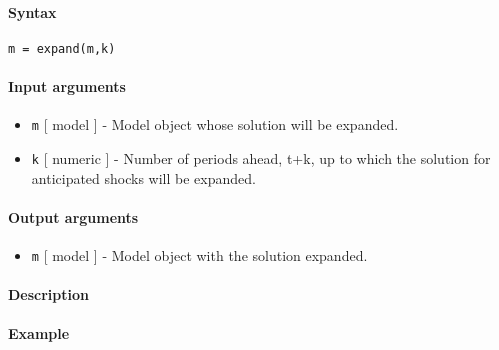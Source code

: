 


	\paragraph{Syntax}

\begin{verbatim}
m = expand(m,k)
\end{verbatim}

\paragraph{Input arguments}

\begin{itemize}
\item
  \texttt{m} {[} model {]} - Model object whose solution will be
  expanded.
\item
  \texttt{k} {[} numeric {]} - Number of periods ahead, t+k, up to which
  the solution for anticipated shocks will be expanded.
\end{itemize}

\paragraph{Output arguments}

\begin{itemize}
\itemsep1pt\parskip0pt
\item
  \texttt{m} {[} model {]} - Model object with the solution expanded.
\end{itemize}

\paragraph{Description}

\paragraph{Example}


